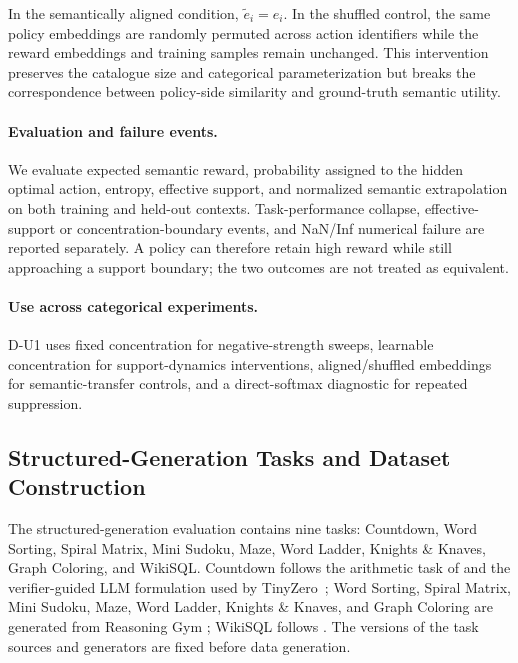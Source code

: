\documentclass{article}
\theoremstyle{plain}
\theoremstyle{definition}
\theoremstyle{remark}
\begin{document}
In the semantically aligned condition,
$\widetilde e_i=e_i$.
In the shuffled control, the same policy embeddings are randomly
permuted across action identifiers while the reward embeddings and
training samples remain unchanged. This intervention preserves the
catalogue size and categorical parameterization but breaks the
correspondence between policy-side similarity and ground-truth semantic
utility.

\paragraph{Evaluation and failure events.}
We evaluate expected semantic reward, probability assigned to the hidden
optimal action, entropy, effective support, and normalized semantic
extrapolation on both training and held-out contexts. Task-performance
collapse, effective-support or concentration-boundary events, and
NaN/Inf numerical failure are reported separately. A policy can
therefore retain high reward while still approaching a support boundary;
the two outcomes are not treated as equivalent.

\paragraph{Use across categorical experiments.}
D-U1 uses fixed concentration for negative-strength sweeps, learnable
concentration for support-dynamics interventions, aligned/shuffled embeddings
for semantic-transfer controls, and a direct-softmax diagnostic for repeated
suppression.

\subsection{Structured-Generation Tasks and Dataset Construction}
\label{app:structured_generation_dataset}

The structured-generation evaluation contains nine tasks:
Countdown, Word Sorting, Spiral Matrix, Mini Sudoku, Maze, Word Ladder,
Knights \& Knaves, Graph Coloring, and WikiSQL. Countdown follows the
arithmetic task of \citet{hutton2002countdown} and the verifier-guided
LLM formulation used by TinyZero~\citep{pan2025tinyzero}; Word Sorting,
Spiral Matrix, Mini Sudoku, Maze, Word Ladder, Knights \& Knaves, and
Graph Coloring are generated from Reasoning Gym
\citep{stojanovski2025reasoninggym}; WikiSQL follows
\citet{zhong2017seq2sql}. The versions of the task sources and generators are
fixed before data generation.
\end{document}
